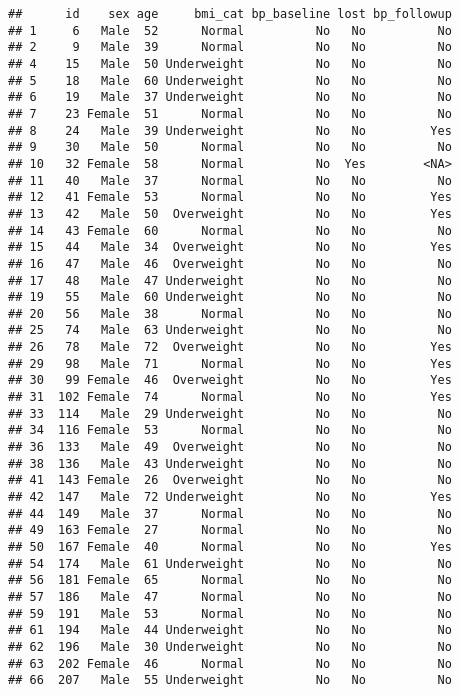 \documentclass[
]{article}
\begin{document}
\begin{verbatim}
##      id    sex age     bmi_cat bp_baseline lost bp_followup
## 1     6   Male  52      Normal          No   No          No
## 2     9   Male  39      Normal          No   No          No
## 4    15   Male  50 Underweight          No   No          No
## 5    18   Male  60 Underweight          No   No          No
## 6    19   Male  37 Underweight          No   No          No
## 7    23 Female  51      Normal          No   No          No
## 8    24   Male  39 Underweight          No   No         Yes
## 9    30   Male  50      Normal          No   No          No
## 10   32 Female  58      Normal          No  Yes        <NA>
## 11   40   Male  37      Normal          No   No          No
## 12   41 Female  53      Normal          No   No         Yes
## 13   42   Male  50  Overweight          No   No         Yes
## 14   43 Female  60      Normal          No   No          No
## 15   44   Male  34  Overweight          No   No         Yes
## 16   47   Male  46  Overweight          No   No          No
## 17   48   Male  47 Underweight          No   No          No
## 19   55   Male  60 Underweight          No   No          No
## 20   56   Male  38      Normal          No   No          No
## 25   74   Male  63 Underweight          No   No          No
## 26   78   Male  72  Overweight          No   No         Yes
## 29   98   Male  71      Normal          No   No         Yes
## 30   99 Female  46  Overweight          No   No         Yes
## 31  102 Female  74      Normal          No   No         Yes
## 33  114   Male  29 Underweight          No   No          No
## 34  116 Female  53      Normal          No   No          No
## 36  133   Male  49  Overweight          No   No          No
## 38  136   Male  43 Underweight          No   No          No
## 41  143 Female  26  Overweight          No   No          No
## 42  147   Male  72 Underweight          No   No         Yes
## 44  149   Male  37      Normal          No   No          No
## 49  163 Female  27      Normal          No   No          No
## 50  167 Female  40      Normal          No   No         Yes
## 54  174   Male  61 Underweight          No   No          No
## 56  181 Female  65      Normal          No   No          No
## 57  186   Male  47      Normal          No   No          No
## 59  191   Male  53      Normal          No   No          No
## 61  194   Male  44 Underweight          No   No          No
## 62  196   Male  30 Underweight          No   No          No
## 63  202 Female  46      Normal          No   No          No
## 66  207   Male  55 Underweight          No   No          No

\end{verbatim}
\end{document}
